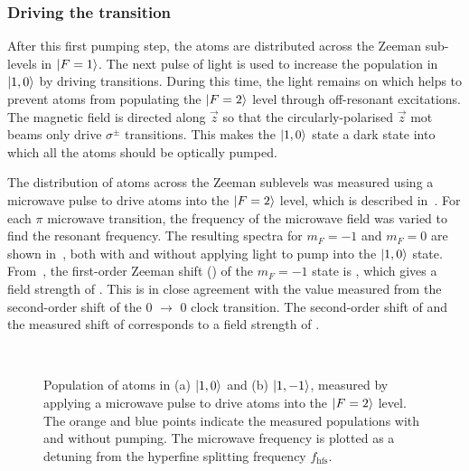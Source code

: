 \subsubsection{Driving the  transition}
After this first pumping step, the atoms are distributed across the
Zeeman sub-levels in \(\ket{F=1}\). The next pulse of light is used to
increase the population in \(\ket{1,0}\) by driving 
transitions. During this time, the  light remains on which
helps to prevent atoms from populating the \(\ket{F=2}\) level through
off-resonant  excitations. The magnetic field is directed
along $\vec{z}$ so that the circularly-polarised \(\vec{z}\) \ac{mot} beams only
drive \(\sigma^{\pm}\) transitions. This makes the \(\ket{1,0}\) state
a dark state into which all the atoms should be optically pumped. 
\par\noindent
The distribution of atoms across the Zeeman sublevels was measured
using a microwave pulse to drive atoms into the \(\ket{F=2}\) level,
which is described in~. For each \(\pi\)
microwave transition, the frequency of the microwave field was varied
to find the resonant frequency. The resulting spectra for \(m_F = -1\)
and \(m_F = 0\) are shown in~,
both with and without applying light to pump into the \(\ket{1,0}\)
state. From~, the first-order
Zeeman shift () of the $m_F = -1$ state is , which gives a
field strength of . This is in close agreement
with the value measured from the second-order shift of the 0
\(\rightarrow\) 0 clock transition. The second-order shift of
 and the measured shift of
 corresponds to a field strength of
. 
\begin{figure}[!htbp]
    \centering
    \def\svgwidth{\columnwidth}
    \\
    \caption[\(m_F\) populations before and after  pumping]{Population of atoms in (a) \(\ket{1,0}\) and (b) \(\ket{1,-1}\), measured by applying a  microwave pulse to drive atoms into the \(\ket{F=2}\) level. The orange and blue points indicate the measured populations with and without  pumping. The microwave frequency is plotted as a detuning from the hyperfine splitting frequency \(f_\text{hfs}\).}
    \label{fig:step2_microwave_spec}
\end{figure} 
